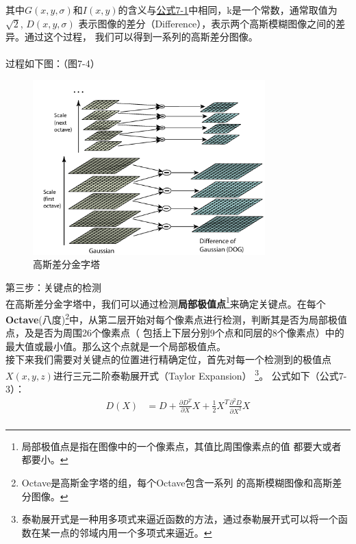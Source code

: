 \documentclass{nwputhesis}
\begin{document}
\indent
其中$G(x,y,\sigma)$和$I(x,y)$的含义与\hyperlink{公式7-1}{公式7-1}中相同，k是一个常数，通常取值为$\sqrt{2}$, 
$D(x,y,\sigma)$ 表示图像的差分（Difference），表示两个高斯模糊图像之间的差异。通过这个过程，
我们可以得到一系列的高斯差分图像。\\ \\
\indent
过程如下图：（图7-4）
\begin{figure}[H]
    \centering
    \includegraphics[width=0.8\textwidth]{picture/24.png}
    \caption{高斯差分金字塔}
\end{figure}
\noindent
第三步：关键点的检测\\
\indent
在高斯差分金字塔中，我们可以通过检测\textbf{局部极值点}\footnote{局部极值点是指在图像中的一个像素点，其值比周围像素点的值
都要大或者都要小。}来确定关键点。在每个\textbf{Octave}(八度)\footnote{Octave是高斯金字塔的组，每个Octave包含一系列
的高斯模糊图像和高斯差分图像。}中，从第二层开始对每个像素点进行检测，判断其是否为局部极值点，及是否为周围26个像素点（
包括上下层分别9个点和同层的8个像素点）中的最大值或最小值。那么这个点就是一个局部极值点。\\
\indent
接下来我们需要对关键点的位置进行精确定位，首先对每一个检测到的极值点$X(x,y,z)$进行三元二阶泰勒展开式（Taylor Expansion）
\footnote{泰勒展开式是一种用多项式来逼近函数的方法，通过泰勒展开式可以将一个函数在某一点的邻域内用一个多项式来逼近。}。
公式如下（公式7-3）：
\begin{equation}
    \begin{aligned}
        D(X) &= D + \frac{\partial D^T}{\partial X}X + \frac{1}{2}X^T\frac{\partial^2D}{\partial X^2}X\\
    \end{aligned}
\end{equation}
\end{document}
